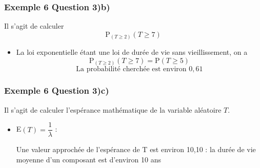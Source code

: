 \documentclass[xcolor=svgnames,t,final]{beamer}
\begin{document}
\begin{frame}


\frametitle{Exemple 6 Question 3)b)}

Il s'agit de calculer 
\[\text{P}_{(T\geqslant 2)}(T\geqslant 7)\]	


\begin{itemize}

	\pause	\item
	
La loi exponentielle étant une loi de durée de vie sans vieillissement, on a 
\[\text{P}_{(T\geqslant 2)}(T\geqslant 7)=\text{P}(T\geqslant 5)\]	\[\text{La probabilité cherchée est environ } 0,61\]


\end{itemize}


\end{frame}


\begin{frame}


\frametitle{Exemple 6 Question 3)c)}

Il s'agit de calculer l'espérance mathématique de la variable aléatoire $T$.


\begin{itemize}

	\pause		\item	
E$(T)=\dfrac{1}{\lambda}$ :


Une valeur approchée de l'espérance de T est environ 10,10 :	
la durée de vie moyenne d'un composant est d'environ 10 ans


\end{itemize}


\end{frame}
\end{document}
